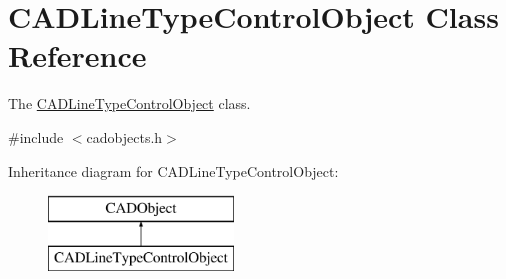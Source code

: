 \hypertarget{class_c_a_d_line_type_control_object}{}\section{C\+A\+D\+Line\+Type\+Control\+Object Class Reference}
\label{class_c_a_d_line_type_control_object}


The \hyperlink{class_c_a_d_line_type_control_object}{C\+A\+D\+Line\+Type\+Control\+Object} class.  




{\ttfamily \#include $<$cadobjects.\+h$>$}

Inheritance diagram for C\+A\+D\+Line\+Type\+Control\+Object\+:\begin{figure}[H]
\begin{center}
\leavevmode
\includegraphics[height=2.000000cm]{class_c_a_d_line_type_control_object}
\end{center}
\end{figure}
